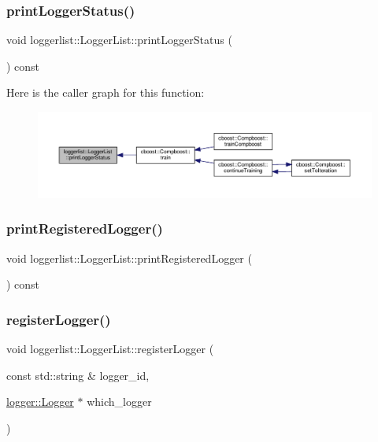 \subsubsection{\texorpdfstring{print\+Logger\+Status()}{printLoggerStatus()}}
{\footnotesize\ttfamily void loggerlist\+::\+Logger\+List\+::print\+Logger\+Status (\begin{DoxyParamCaption}{ }\end{DoxyParamCaption}) const}

Here is the caller graph for this function\+:\nopagebreak
\begin{figure}[H]
\begin{center}
\leavevmode
\includegraphics[width=350pt]{classloggerlist_1_1_logger_list_a5ec429c3927009e3d87544a0f084e678_icgraph}
\end{center}
\end{figure}
\mbox{\label{classloggerlist_1_1_logger_list_a28cd5371bbd9e31f0cf041d6e73d156c}} 
\subsubsection{\texorpdfstring{print\+Registered\+Logger()}{printRegisteredLogger()}}
{\footnotesize\ttfamily void loggerlist\+::\+Logger\+List\+::print\+Registered\+Logger (\begin{DoxyParamCaption}{ }\end{DoxyParamCaption}) const}

\mbox{\label{classloggerlist_1_1_logger_list_a883c2526c3e56e572df670f64b966d41}} 
\subsubsection{\texorpdfstring{register\+Logger()}{registerLogger()}}
{\footnotesize\ttfamily void loggerlist\+::\+Logger\+List\+::register\+Logger (\begin{DoxyParamCaption}\item[{const std\+::string \&}]{logger\+\_\+id,  }\item[{\hyperlink{classlogger_1_1_logger}{logger\+::\+Logger} $\ast$}]{which\+\_\+logger }\end{DoxyParamCaption})}

